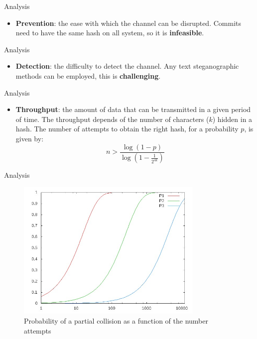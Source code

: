 \documentclass[11pt, compress]{beamer}
\begin{document}
\begin{frame}{Analysis}
\begin{itemize}
\item \textbf{Prevention}: the ease with which the channel can be disrupted. Commits need to have the same hash on all system, so it is \textbf{infeasible}.
\end{itemize}
\end{frame}

\begin{frame}{Analysis}
\begin{itemize}
\item \textbf{Detection}: the difficulty to detect the channel. Any text steganographic methods can be employed, this is \textbf{challenging}.
\end{itemize}
\end{frame}

\begin{frame}{Analysis}
\begin{itemize}
\item \textbf{Throughput}: the amount of data that can be transmitted in a given period of time.
The throughput depends of the number of characters ($k$) hidden in a hash. The number of attempts to obtain the right hash, for a probability $p$, is given by:
\begin{equation*}
\label{eq:num_attempts}
n > \frac{\log(1 - p)}{\log(1 - \frac{1}{2^{4k}})}
\end{equation*}

\end{itemize}

\end{frame}

\begin{frame}{Analysis}
\begin{figure}
    \includegraphics[width=0.8\textwidth]{images/plot.jpg}
    \caption{Probability of a partial collision as a function of the number attempts}
    \label{fig:plot}
\end{figure}
\end{frame}
\end{document}
